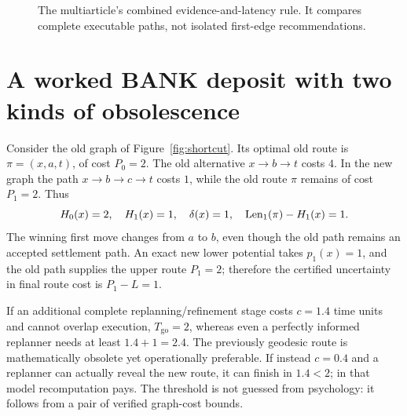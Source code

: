 \documentclass[11pt]{article}
\theoremstyle{definition}\newtheorem{definition}[theorem]{Definition}\newtheorem{assumption}[theorem]{Assumption}
\theoremstyle{remark}\newtheorem{remark}[theorem]{Remark}
\begin{document}
\begin{figure}[htbp]\centering
{}
\caption{The multiarticle's combined evidence-and-latency rule. It compares complete executable paths, not isolated first-edge recommendations.}\label{fig:decision}
\end{figure}

\section{A worked BANK deposit with two kinds of obsolescence}
\label{sec:worked}
Consider the old graph of Figure~\ref{fig:shortcut}. Its optimal old route is $\pi=(x,a,t)$, of cost $P_0=2$. The old alternative $x\to b\to t$ costs $4$. In the new graph the path $x\to b\to c\to t$ costs $1$, while the old route $\pi$ remains of cost $P_1=2$. Thus
\[
H_0(x)=2,\quad H_1(x)=1,\quad\delta(x)=1,\quad\operatorname{Len}_1(\pi)-H_1(x)=1.
\]
The winning first move changes from $a$ to $b$, even though the old path remains an accepted settlement path. An exact new lower potential takes $p_1(x)=1$, and the old path supplies the upper route $P_1=2$; therefore the certified uncertainty in final route cost is $P_1-L=1$.

If an additional complete replanning/refinement stage costs $c=1.4$ time units and cannot overlap execution, $T_{\mathrm{go}}=2$, whereas even a perfectly informed replanner needs at least $1.4+1=2.4$. The previously geodesic route is mathematically obsolete yet operationally preferable. If instead $c=0.4$ and a replanner can actually reveal the new route, it can finish in $1.4<2$; in that model recomputation pays. The threshold is not guessed from psychology: it follows from a pair of verified graph-cost bounds.
\end{document}
